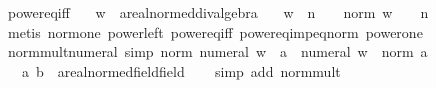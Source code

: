 \begin{isabellebody}
\isamarkupfalse%
%
\endisatagproof
{\isafoldproof}%
%
\isadelimproof
\isanewline
%
\endisadelimproof
\isanewline
{}\isamarkupfalse%
\ power{\isacharunderscore}{\kern0pt}eq{\isacharunderscore}{\kern0pt}{}{\isacharunderscore}{\kern0pt}iff{\isacharcolon}{\kern0pt}\isanewline
\ \ \ w\ {\isacharcolon}{\kern0pt}{\isacharcolon}{\kern0pt}\ {\isachardoublequoteopen}{\isacharprime}{\kern0pt}a{\isacharcolon}{\kern0pt}{\isacharcolon}{\kern0pt}real{\isacharunderscore}{\kern0pt}normed{\isacharunderscore}{\kern0pt}div{\isacharunderscore}{\kern0pt}algebra{\isachardoublequoteclose}\isanewline
\ \ \ {\isachardoublequoteopen}w\ {\isacharcircum}{\kern0pt}\ n\ {\isacharequal}{\kern0pt}\ {}\ {\isasymLongrightarrow}\ norm\ w\ {\isacharequal}{\kern0pt}\ {}\ {\isasymor}\ n\ {\isacharequal}{\kern0pt}\ {}{\isachardoublequoteclose}\isanewline
%
\isadelimproof
\ \ %
\endisadelimproof
%
\isatagproof
{}\isamarkupfalse%
\ {\isacharparenleft}{\kern0pt}metis\ norm{\isacharunderscore}{\kern0pt}one\ power{\isacharunderscore}{\kern0pt}{}{\isacharunderscore}{\kern0pt}left\ power{\isacharunderscore}{\kern0pt}eq{\isacharunderscore}{\kern0pt}{}{\isacharunderscore}{\kern0pt}iff\ power{\isacharunderscore}{\kern0pt}eq{\isacharunderscore}{\kern0pt}imp{\isacharunderscore}{\kern0pt}eq{\isacharunderscore}{\kern0pt}norm\ power{\isacharunderscore}{\kern0pt}one{\isacharparenright}{\kern0pt}%
\endisatagproof
{\isafoldproof}%
%
\isadelimproof
\isanewline
%
\endisadelimproof
\isanewline
{}\isamarkupfalse%
\ norm{\isacharunderscore}{\kern0pt}mult{\isacharunderscore}{\kern0pt}numeral{}\ {\isacharbrackleft}{\kern0pt}simp{\isacharbrackright}{\kern0pt}{\isacharcolon}{\kern0pt}\ {\isachardoublequoteopen}norm\ {\isacharparenleft}{\kern0pt}numeral\ w\ {\isacharasterisk}{\kern0pt}\ a{\isacharparenright}{\kern0pt}\ {\isacharequal}{\kern0pt}\ numeral\ w\ {\isacharasterisk}{\kern0pt}\ norm\ a{\isachardoublequoteclose}\isanewline
\ \ \ a\ b\ {\isacharcolon}{\kern0pt}{\isacharcolon}{\kern0pt}\ {\isachardoublequoteopen}{\isacharprime}{\kern0pt}a{\isacharcolon}{\kern0pt}{\isacharcolon}{\kern0pt}{\isacharbraceleft}{\kern0pt}real{\isacharunderscore}{\kern0pt}normed{\isacharunderscore}{\kern0pt}field{\isacharcomma}{\kern0pt}field{\isacharbraceright}{\kern0pt}{\isachardoublequoteclose}\isanewline
%
\isadelimproof
\ \ %
\endisadelimproof
%
\isatagproof
{}\isamarkupfalse%
\ {\isacharparenleft}{\kern0pt}simp\ add{\isacharcolon}{\kern0pt}\ norm{\isacharunderscore}{\kern0pt}mult{\isacharparenright}{\kern0pt}%

\end{isabellebody}
